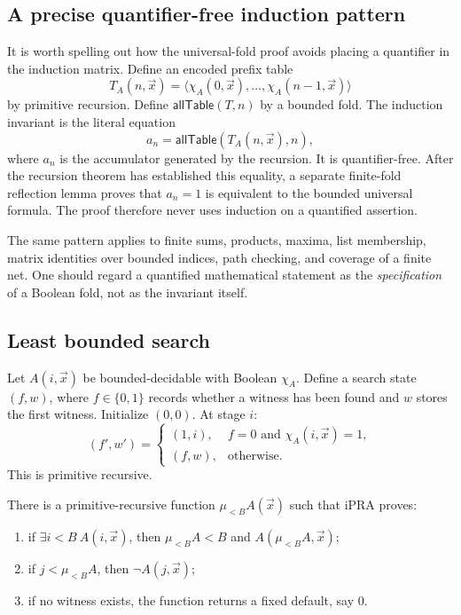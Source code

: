 \subsection{A precise quantifier-free induction pattern}

It is worth spelling out how the universal-fold proof avoids placing a quantifier in the induction matrix.  Define an encoded prefix table
\[
 T_A(n,\vec{x})=\langle \chi_A(0,\vec{x}),\ldots,
                    \chi_A(n-1,\vec{x})\rangle
\]
by primitive recursion.  Define \(\mathsf{allTable}(T,n)\) by a bounded fold.  The induction invariant is the literal equation
\[
  a_n=\mathsf{allTable}(T_A(n,\vec{x}),n),
\]
where \(a_n\) is the accumulator generated by the recursion.  It is quantifier-free.  After the recursion theorem has established this equality, a separate finite-fold reflection lemma proves that \(a_n=1\) is equivalent to the bounded universal formula.  The proof therefore never uses induction on a quantified assertion.

The same pattern applies to finite sums, products, maxima, list membership, matrix identities over bounded indices, path checking, and coverage of a finite net.  One should regard a quantified mathematical statement as the \emph{specification} of a Boolean fold, not as the invariant itself.

\subsection{Least bounded search}

Let \(A(i,\vec{x})\) be bounded-decidable with Boolean \(\chi_A\).  Define a search state \((f,w)\), where \(f\in\{0,1\}\) records whether a witness has been found and \(w\) stores the first witness.  Initialize \((0,0)\).  At stage \(i\):
\[
 (f',w')=
 \begin{cases}
 (1,i),& f=0\text{ and }\chi_A(i,\vec{x})=1,\\
 (f,w),&\text{otherwise.}
 \end{cases}
\]
This is primitive recursive.

\begin{theorem}
\label{thm:least-search}
There is a primitive-recursive function \(\mu_{<B}A(\vec{x})\) such that iPRA proves:

\begin{enumerate}
\item if \(\exists i<B\ A(i,\vec{x})\), then
\(\mu_{<B}A<B\) and \(A(\mu_{<B}A,\vec{x})\);
\item if \(j<\mu_{<B}A\), then \(\neg A(j,\vec{x})\);
\item if no witness exists, the function returns a fixed default, say \(0\).
\end{enumerate}
\end{theorem}

